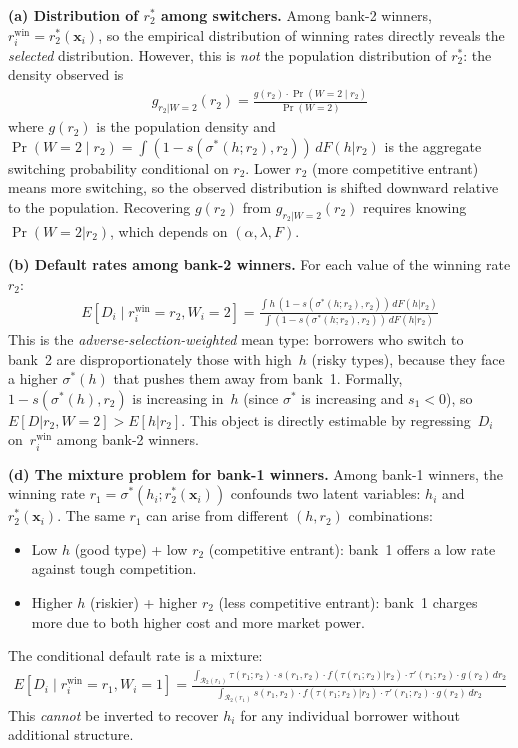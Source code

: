 \documentclass[12pt]{article}
\theoremstyle{plain}
\theoremstyle{plain}
\theoremstyle{definition}  %
\theoremstyle{remark}  %
\begin{document}
\medskip\noindent
\textbf{(a) Distribution of $r_2^*$ among switchers.}  Among bank-2 winners, $r_i^{\text{win}} = r_2^*(\mathbf{x}_i)$, so the empirical distribution of winning rates directly reveals the \emph{selected} distribution.  However, this is \emph{not} the population distribution of $r_2^*$: the density observed is
\begin{align}\label{eq:g2_selected}
    g_{r_2 | W=2}(r_2) = \frac{g(r_2) \cdot \Pr(W=2 \mid r_2)}{\Pr(W=2)}
\end{align}
where $g(r_2)$ is the population density and $\Pr(W=2 \mid r_2) = \int (1-s(\sigma^*(h; r_2), r_2))\, dF(h|r_2)$ is the aggregate switching probability conditional on $r_2$.  Lower $r_2$ (more competitive entrant) means more switching, so the observed distribution is shifted downward relative to the population.  Recovering $g(r_2)$ from $g_{r_2|W=2}(r_2)$ requires knowing $\Pr(W=2|r_2)$, which depends on $(\alpha, \lambda, F)$.

\medskip\noindent
\textbf{(b) Default rates among bank-2 winners.}  For each value of the winning rate $r_2$:
\begin{align}\label{eq:d2_mixture}
    E[D_i \mid r_i^{\text{win}} = r_2, W_i = 2] = \frac{\int h\,(1-s(\sigma^*(h;r_2),r_2))\, dF(h|r_2)}{\int (1-s(\sigma^*(h;r_2),r_2))\, dF(h|r_2)}
\end{align}
This is the \emph{adverse-selection-weighted} mean type: borrowers who switch to bank~2 are disproportionately those with high~$h$ (risky types), because they face a higher $\sigma^*(h)$ that pushes them away from bank~1.  Formally, $1-s(\sigma^*(h),r_2)$ is increasing in~$h$ (since $\sigma^*$ is increasing and $s_1 < 0$), so $E[D|r_2, W\!=\!2] > E[h|r_2]$.  This object is directly estimable by regressing~$D_i$ on~$r_i^{\text{win}}$ among bank-2 winners.

\medskip\noindent
\textbf{(d) The mixture problem for bank-1 winners.}  Among bank-1 winners, the winning rate $r_1 = \sigma^*(h_i; r_2^*(\mathbf{x}_i))$ confounds two latent variables: $h_i$ and $r_2^*(\mathbf{x}_i)$.  The same $r_1$ can arise from different $(h, r_2)$ combinations:
\begin{itemize}
    \item Low $h$ (good type) + low $r_2$ (competitive entrant): bank~1 offers a low rate against tough competition.
    \item Higher $h$ (riskier) + higher $r_2$ (less competitive entrant): bank~1 charges more due to both higher cost and more market power.
\end{itemize}
The conditional default rate is a mixture:
\begin{align}\label{eq:mixture}
    E[D_i \mid r_i^{\text{win}} = r_1, W_i = 1] = \frac{\int_{\mathcal{R}_2(r_1)} \tau(r_1; r_2) \cdot s(r_1, r_2) \cdot f(\tau(r_1;r_2)|r_2) \cdot \tau'(r_1;r_2) \cdot g(r_2)\, dr_2}{\int_{\mathcal{R}_2(r_1)} s(r_1, r_2) \cdot f(\tau(r_1;r_2)|r_2) \cdot \tau'(r_1;r_2) \cdot g(r_2)\, dr_2}
\end{align}
This \emph{cannot} be inverted to recover $h_i$ for any individual borrower without additional structure.
\end{document}
